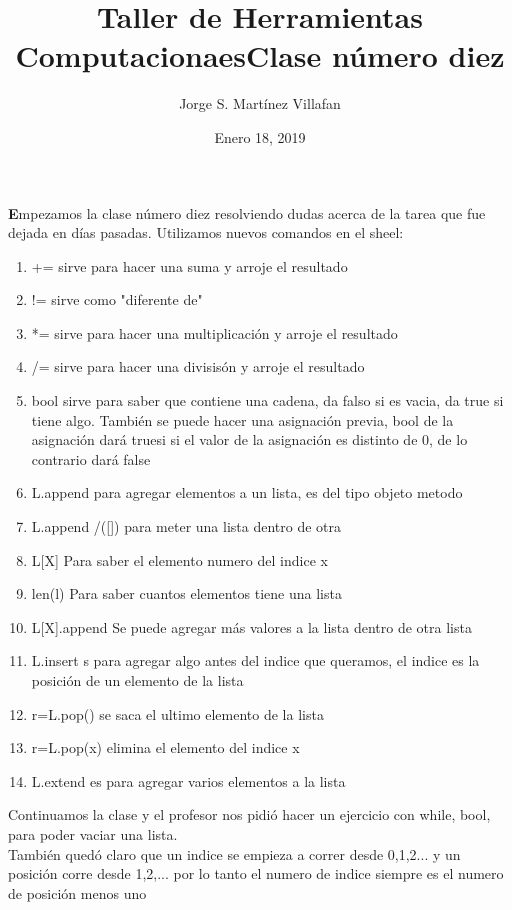 \documentclass[letterpaper, 12pt, oneside]{article}%
\title{\Huge Taller de Herramientas Computacionaes}
\author{Jorge S. Martínez Villafan}
\date{Enero 18, 2019}
\begin{document}
\maketitle
\newpage
\title{Clase número diez}

\textbf Empezamos la clase número diez resolviendo dudas acerca de la tarea que fue dejada en días pasadas. Utilizamos nuevos comandos en el sheel:
\begin{enumerate}
\item += sirve para hacer una suma y arroje el resultado
\item != sirve como "diferente de"
\item *= sirve para hacer una multiplicación y arroje el resultado
\item /= sirve para hacer una divisisón y arroje el resultado
\item bool sirve para saber que contiene una cadena, da falso si es vacia, da true si tiene algo. También se puede hacer una asignación previa, bool de la asignación dará truesi si el valor de la asignación es distinto de 0, de lo contrario dará false
\item L.append para agregar elementos a un lista, es del tipo objeto metodo
\item L.append /([]) para meter una lista dentro de otra
\item L[X] Para saber el elemento numero del indice x 
\item len(l) Para saber cuantos elementos tiene una lista
\item L[X].append Se puede agregar más valores a la lista dentro de otra lista
\item L.insert s para agregar algo antes del indice que queramos, el indice es la posición de un elemento de la lista
\item r=L.pop() se saca el ultimo elemento de la lista
\item r=L.pop(x) elimina el elemento del indice x
\item L.extend es para agregar varios elementos a la lista

\end{enumerate} 
Continuamos la clase y el profesor nos pidió hacer un ejercicio con while, bool, para poder vaciar una lista.\\ 
También quedó claro que un indice se empieza a correr desde 0,1,2... y un posición corre desde 1,2,... por lo tanto el numero de indice siempre es el numero de posición menos uno\\
\end{document}

